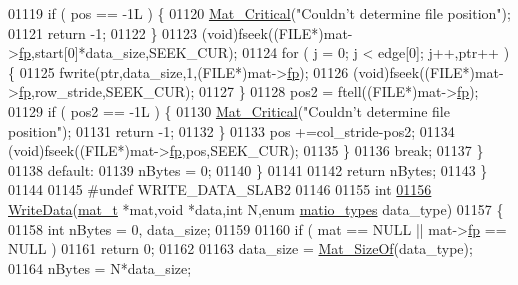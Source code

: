 \begin{DoxyCode}
{{{{01119                 \textcolor{keywordflow}{if} ( pos == -1L ) \{
01120                     \hyperlink{group__mat__util_gaf51f2bfbb5580f575e4dd79757e2b80c}{Mat\_Critical}(\textcolor{stringliteral}{"Couldn't determine file position"});
01121                     \textcolor{keywordflow}{return} -1;
01122                 \}
01123                 (void)fseek((FILE*)mat->\hyperlink{struct__mat__t_a85f562e407ca9ad4d2a6e14f839432b7}{fp},start[0]*data\_size,SEEK\_CUR);
01124                 \textcolor{keywordflow}{for} ( j = 0; j < edge[0]; j++,ptr++ ) \{
01125                     fwrite(ptr,data\_size,1,(FILE*)mat->\hyperlink{struct__mat__t_a85f562e407ca9ad4d2a6e14f839432b7}{fp});
01126                     (void)fseek((FILE*)mat->\hyperlink{struct__mat__t_a85f562e407ca9ad4d2a6e14f839432b7}{fp},row\_stride,SEEK\_CUR);
01127                 \}
01128                 pos2 = ftell((FILE*)mat->\hyperlink{struct__mat__t_a85f562e407ca9ad4d2a6e14f839432b7}{fp});
01129                 \textcolor{keywordflow}{if} ( pos2 == -1L ) \{
01130                     \hyperlink{group__mat__util_gaf51f2bfbb5580f575e4dd79757e2b80c}{Mat\_Critical}(\textcolor{stringliteral}{"Couldn't determine file position"});
01131                     \textcolor{keywordflow}{return} -1;
01132                 \}
01133                 pos +=col\_stride-pos2;
01134                 (void)fseek((FILE*)mat->\hyperlink{struct__mat__t_a85f562e407ca9ad4d2a6e14f839432b7}{fp},pos,SEEK\_CUR);
01135             \}
01136             \textcolor{keywordflow}{break};
01137         \}
01138         \textcolor{keywordflow}{default}:
01139             nBytes = 0;
01140     \}
01141 
01142     \textcolor{keywordflow}{return} nBytes;
01143 \}
01144 
01145 \textcolor{preprocessor}{#undef WRITE\_DATA\_SLAB2}
01146 
01155 \textcolor{keywordtype}{int}
\hyperlink{mat5_8c_a1bec2ccf2a3b48706edd32e63744d364}{01156} \hyperlink{mat5_8c_a1bec2ccf2a3b48706edd32e63744d364}{WriteData}(\hyperlink{struct__mat__t}{mat\_t} *mat,\textcolor{keywordtype}{void} *data,\textcolor{keywordtype}{int} N,\textcolor{keyword}{enum} \hyperlink{group___m_a_t_gacf7b3b879282b7ab3a51190e49bf3453}{matio\_types} data\_type)
01157 \{
01158     \textcolor{keywordtype}{int} nBytes = 0, data\_size;
01159 
01160     \textcolor{keywordflow}{if} ( mat == NULL || mat->\hyperlink{struct__mat__t_a85f562e407ca9ad4d2a6e14f839432b7}{fp} == NULL )
01161         \textcolor{keywordflow}{return} 0;
01162 
01163     data\_size = \hyperlink{group__mat__util_gab6774aabdc124c540c1e7686d0804940}{Mat\_SizeOf}(data\_type);
01164     nBytes    = N*data\_size;
}}}}
\end{DoxyCode}
